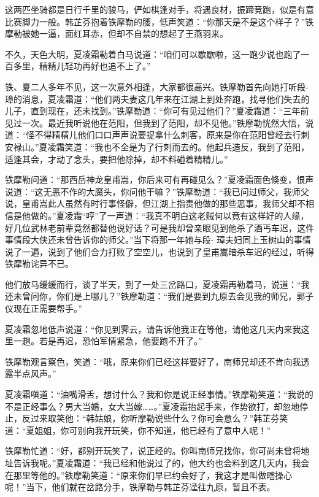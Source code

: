 \documentclass[12pt,oneside]{book}
\begin{document}
这两匹坐骑都是日行千里的骏马，俨如棋逢对手，将遇良材，振蹄竞跑，似是有意比赛脚力一般。韩芷芬抱着铁摩勒的腰，低声笑道：``你那天是不是这个样子？''铁摩勒被她一逼，面红耳赤，但却不自禁的想起了王燕羽来。

不久，天色大明，夏凌霜勒着白马说道：``咱们可以歇歇啦，这一跑少说也跑了一百多里，精精儿轻功再好也追不上了。''

铁、夏二人多年不见，这一次意外相逢，大家都很高兴。铁摩勒首先向她打听段-
璋的消息，夏凌霜道：``他们两夫妻这几年来在江湖上到处奔跑，找寻他们失去的儿子，直到现在，还未找到。''铁摩勒道：``你可有见过他们？''夏凌霜道：``三年前见过一次。最近我听说他在范阳，但我到了范阳，却不见他。''铁摩勒恍然大悟，说道：``怪不得精精儿他们口口声声说要捉拿什么刺客，原来是你在范阳曾经去行刺安禄山。''夏凌霜笑道：``我也不全是为了行刺而去的。他起兵造反，我到了范阳，适逢其会，才动了念头，要把他除掉，却不料碰着精精儿。''

铁摩勒问道：``那西岳神龙皇甫嵩，你后来可有再碰见么？''夏凌霜面色倏变，恨声说道：``这无恶不作的大魔头，你问他干嘛？''铁摩勒道：``我已问过师父，我师父说，皇甫嵩此人虽然有时行事怪僻，但江湖上指责他做的那些恶事，我师父却不相信是他做的。''夏凌霜``哼''了一声道：``我真不明白这老贼何以竟有这样好的人缘，好几位武林老前辈竟然都替他说好话？可是我却曾亲眼见到他杀了酒丐车迟，这件事情段大侠还未曾告诉你的师父。''当下将那一年她与段-
璋夫妇同上玉树山的事情说了一遍，说到了他们合力打败了空空儿，也说到了皇甫嵩暗杀车迟的经过，听得铁摩勒诧异不已。

他们放马缓缓而行，谈了半天，到了一处三岔路口，夏凌霜再勒着马，说道：``我还未曾问你，你们是上哪儿？''铁摩勒道：``我们是要到九原去会见我的师兄，郭子仪现在正需要帮手。''

夏凌霜忽地低声说道：``你见到霁云，请告诉他我正在等他，请他这几天内来我这里一趟。若是再迟，恐怕军情紧急，他要跑不开了。''

铁摩勒观言察色，笑道：``哦，原来你们已经这样要好了，南师兄却还不肯向我透露半点风声。''

夏凌霜嗔道：``油嘴滑舌，想讨什么？我和你是说正经事情。''铁摩勒笑道：``我说的不是正经事么？男大当婚，女大当嫁\ldots\ldots。''夏凌霜抬起手来，作势欲打，却忽地停止，反过来取笑他：``韩姑娘，你听摩勒说些什么？你可会意么？''韩芷芬笑道：``夏姐姐，你可别向我开玩笑，你不知道，他已经有了意中人呢！''

铁摩勒忙道：``好，都别开玩笑了，说正经的。你叫南师兄找你，你可尚未曾将地址告诉我呢。''夏凌霜道：``我已经和他说过了的，他大约也会料到这几天内，我会在那里等他的。''铁摩勒笑道：``原来你们早已约会好了，我这才是叫做瞎操心呢！''当下，他们就在岔路分手，铁摩勒与韩芷芬迳往九原，暂且不表。
\end{document}

